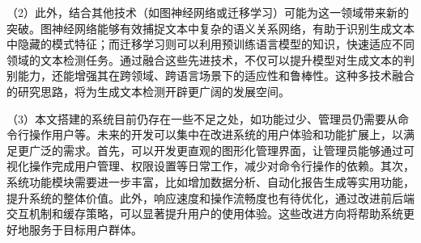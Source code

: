 \begin{conclusion}
（2）此外，结合其他技术（如图神经网络或迁移学习）可能为这一领域带来新的突破。图神经网络能够有效捕捉文本中复杂的语义关系网络，有助于识别生成文本中隐藏的模式特征；而迁移学习则可以利用预训练语言模型的知识，快速适应不同领域的文本检测任务。通过融合这些先进技术，不仅可以提升模型对生成文本的判别能力，还能增强其在跨领域、跨语言场景下的适应性和鲁棒性。这种多技术融合的研究思路，将为生成文本检测开辟更广阔的发展空间。

（3）本文搭建的系统目前仍存在一些不足之处，如功能过少、管理员仍需要从命令行操作用户等。未来的开发可以集中在改进系统的用户体验和功能扩展上，以满足更广泛的需求。首先，可以开发更直观的图形化管理界面，让管理员能够通过可视化操作完成用户管理、权限设置等日常工作，减少对命令行操作的依赖。其次，系统功能模块需要进一步丰富，比如增加数据分析、自动化报告生成等实用功能，提升系统的整体价值。此外，响应速度和操作流畅度也有待优化，通过改进前后端交互机制和缓存策略，可以显著提升用户的使用体验。这些改进方向将帮助系统更好地服务于目标用户群体。

\end{conclusion}
